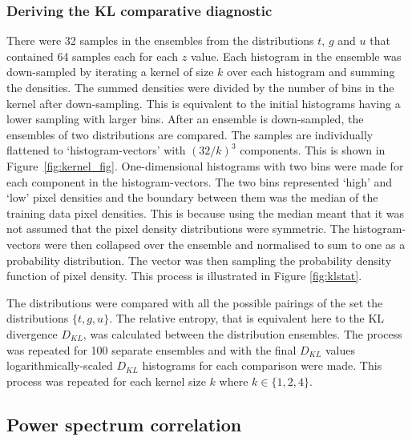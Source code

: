 \documentclass[twocolumn]{article}
\numberwithin{equation}{section}
\begin{document}

\subsubsection{Deriving the KL comparative diagnostic}
There were 32 samples in the ensembles from the distributions $t$, $g$ and $u$ that contained 64 samples each for each $z$ 
value. Each histogram in the ensemble was down-sampled by iterating a kernel of size $k$ over each histogram and summing 
the densities. The summed densities were divided by the number of bins in the kernel after down-sampling. This is equivalent 
to the initial histograms having a lower sampling with larger bins. After an ensemble is down-sampled, the ensembles of two 
distributions are compared. The samples are individually flattened to `histogram-vectors' with $(32/k)^3$ components. 
This is shown in Figure~\ref{fig:kernel_fig}. One-dimensional histograms with two bins were made for each component in the 
histogram-vectors. The two bins represented `high' and `low' pixel densities and the boundary between them was the median 
of the training data pixel densities. This is because using the median meant that it was not assumed that the pixel density 
distributions were symmetric. The histogram-vectors were then collapsed over the ensemble and normalised to sum to one as 
a probability distribution. The vector was then sampling the probability density function of pixel density. This process 
is illustrated in Figure \ref{fig:klstat}.

The distributions were compared with all the possible pairings of the set the distributions $\{ t, g, u\}$. The relative 
entropy, that is equivalent here to the KL divergence $D_{KL}$, was calculated between the distribution ensembles. The 
process was repeated for 100 separate ensembles and with the final $D_{KL}$ values logarithmically-scaled $D_{KL}$ 
histograms for each comparison were made. This process was repeated for each kernel size $k$ where $k \in \{1, 2, 4\}$.


\subsection{Power spectrum correlation}
\end{document}
